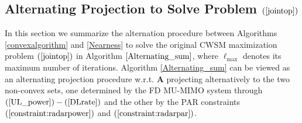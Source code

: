 \documentclass[9pt,journal]{IEEEtran}
\newcommand{\paren}[1]{\left({#1}\right)}
\newcommand{\rr}{_\mathrm{r}}
\begin{document}
\subsection{Alternating Projection to Solve Problem $\paren{\ref{jointop}}$}
In this section we summarize the alternation procedure between Algorithms \ref{convexalgorithm} and \ref{Nearness} to solve the original CWSM maximization problem $\paren{\ref{jointop}}$ in Algorithm $\ref{Alternating_sum}$, where $\mathrm{\ell}_{\textrm{max}}$ denotes its maximum number of iterations. Algorithm \ref{Alternating_sum} can be viewed as an alternating projection procedure w.r.t. $\mathbf{A}$ projecting alternatively to the two non-convex sets, one determined by the FD MU-MIMO system through $\paren{\mathrm{\ref{UL_power}}}-\paren{\mathrm{\ref{DLrate}}}$ and the other by the PAR constraints $\paren{\mathrm{\ref{constraint:radarpower}}}$ and $\paren{\mathrm{\ref{constraint:radarpar}}}$.\par\noindent\small
\end{document}
